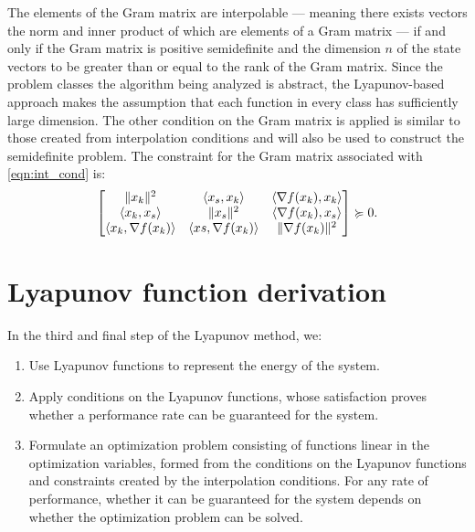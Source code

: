 The elements of the Gram matrix are interpolable --- meaning there exists vectors the norm and inner product of which are elements of a Gram matrix --- if and only if the Gram matrix is positive semidefinite and the dimension $n$ of the state vectors to be greater than or equal to the rank of the Gram matrix. Since the problem classes the algorithm being analyzed is abstract, the Lyapunov-based approach makes the assumption that each function in every class has sufficiently large dimension. The other condition on the Gram matrix is applied is similar to those created from interpolation conditions and will also be used to construct the semidefinite problem. The constraint for the Gram matrix associated with \eqref{eqn:int_cond} is:
\begin{equation} \label{eqn:trans_cond}
		\begin{bmatrix}\|x_k\|^2 & \langle x_s, x_k \rangle & \langle \nabla f(x_k), x_k \rangle \\ \langle x_k, x_s \rangle & \|x_s\|^2 & \langle \nabla f(x_k), x_s \rangle \\ \langle x_k, \nabla f(x_k) \rangle & \langle xs, \nabla f(x_k) \rangle & \|\nabla f(x_k)\|^2\end{bmatrix} \succcurlyeq 0.
	\end{equation}


\section{Lyapunov function derivation} \label{Lyapunov}
In the third and final step of the Lyapunov method, we:
\begin{enumerate}
	\item Use Lyapunov functions to represent the energy of the system.
	\item Apply conditions on the Lyapunov functions, whose satisfaction proves whether a performance rate can be guaranteed for the system.
	\item Formulate an optimization problem consisting of functions linear in the optimization variables, formed from the conditions on the Lyapunov functions and constraints created by the interpolation conditions. For any rate of performance, whether it can be guaranteed for the system depends on whether the optimization problem can be solved.
\end{enumerate}

